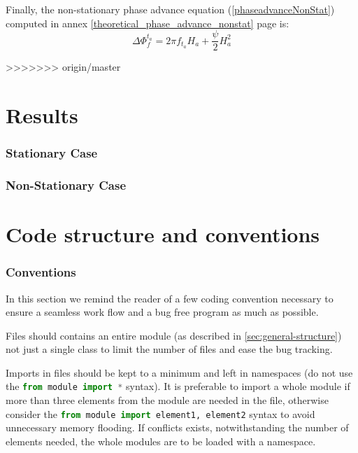 \documentclass[]{article}
\begin{document}
Finally, the non-stationary phase advance equation (\ref{phaseadvanceNonStat}) computed in annex \ref{theoretical_phase_advance_nonstat} page \pageref{theoretical_phase_advance_nonstat} is:
\begin{equation}
\Delta \Phi_{f}^{t_a} = 2\pi f_{t_a} H_a + \frac{\psi}{2}H_a^2
\end{equation}

>>>>>>> origin/master

\newpage
\part{Results}
\section{Stationary Case}\label{sec:stationary-results}
\section{Non-Stationary Case}\label{non-stationary-results}

\newpage
\part{Code structure and conventions}\label{sec:code-structure-and-conventions}

\section{Conventions}\label{sec:conventions}

In this section we remind the reader of a few coding convention necessary to ensure a seamless work flow and a bug free program as much as possible.

Files should contains an entire module (as described in \ref{sec:general-structure}) not just a single class to limit the number of files and ease the bug tracking.

Imports in files should be kept to a minimum and left in namespaces (do not use the \lstinline[columns=fixed,language=Python]|from module import *| syntax). It is preferable to import a whole module if more than three elements from the module are needed in the file, otherwise consider the \lstinline[columns=fixed,language=Python]|from module import element1, element2| syntax to avoid unnecessary memory flooding. If conflicts exists, notwithstanding the number of elements needed, the whole modules are to be loaded with a namespace.
\end{document}

